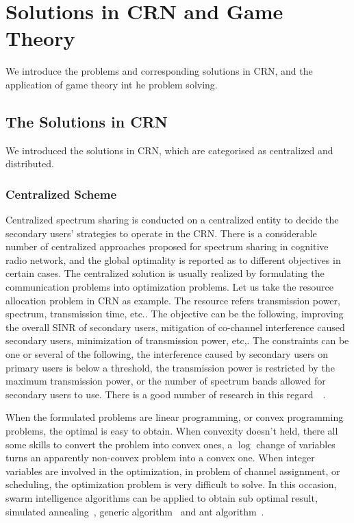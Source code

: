 



\section{Solutions in CRN and Game Theory}
\label{gametheory_crn}

We introduce the problems and corresponding solutions in CRN, and the application of game theory int he problem solving.

\subsection{The Solutions in CRN}
We introduced the solutions in CRN, which are categorised as centralized and distributed.

\subsubsection{Centralized Scheme}
Centralized spectrum sharing is conducted on a centralized entity to decide the secondary users' strategies to operate in the CRN.
There is a considerable number of centralized approaches proposed for spectrum sharing in cognitive radio network, and the global optimality is reported as to different objectives in certain cases.
%
The centralized solution is usually realized by formulating the communication problems into optimization problems.
Let us take the resource allocation problem in CRN as example.
The resource refers transmission power, spectrum, transmission time, etc..
The objective can be the following, improving the overall SINR of secondary users, mitigation of co-channel interference caused secondary users, minimization of transmission power, etc,.
The constraints can be one or several of the following, the interference caused by secondary users on primary users is below a threshold, the transmission power is restricted by the maximum transmission power, or the number of spectrum bands allowed for secondary users to use.
There is a good number of research in this regard~\cite{resource_allocation_crn_Ahmad_2015}~\cite[Chapter~6]{Han:2008:RAW:1457343}.

When the formulated problems are linear programming, or convex programming problems, the optimal is easy to obtain.
When convexity doesn't held, there all some skills to convert the problem into convex ones, \eg a $\log$ change of variables turns an apparently non-convex problem into a convex one.
When integer variables are involved in the optimization, \eg in problem of channel assignment, or scheduling, the optimization problem is very difficult to solve.
In this occasion, swarm intelligence algorithms can be applied to obtain sub optimal result, \ie simulated annealing~\cite{simulated_annealing_09, Tang20122690}, generic algorithm~\cite{Chen_2010} and ant algorithm~\cite{he_2012}.

